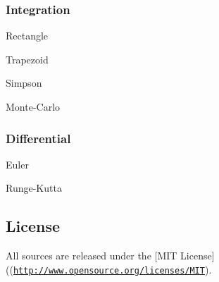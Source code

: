 \subsubsection*{Integration}


\begin{DoxyItemize}
\item Rectangle
\item Trapezoid
\item Simpson
\item Monte-\/\+Carlo
\end{DoxyItemize}

\subsubsection*{Differential}


\begin{DoxyItemize}
\item Euler
\item Runge-\/\+Kutta
\end{DoxyItemize}

\subsection*{License}

All sources are released under the \mbox{[}M\+IT License\mbox{]}((\href{http://www.opensource.org/licenses/MIT}{\tt http\+://www.\+opensource.\+org/licenses/\+M\+IT}). 